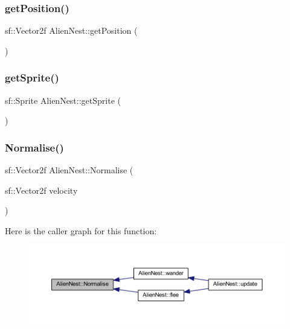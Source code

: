 \mbox{\label{class_alien_nest_a1d0491e4d757b1f068fcdfdff3af4263}} 
\subsubsection{\texorpdfstring{get\+Position()}{getPosition()}}
{\footnotesize\ttfamily sf\+::\+Vector2f Alien\+Nest\+::get\+Position (\begin{DoxyParamCaption}{ }\end{DoxyParamCaption})}

\mbox{\label{class_alien_nest_ab37d12dc080c9433d0b34324160c4540}} 
\subsubsection{\texorpdfstring{get\+Sprite()}{getSprite()}}
{\footnotesize\ttfamily sf\+::\+Sprite Alien\+Nest\+::get\+Sprite (\begin{DoxyParamCaption}{ }\end{DoxyParamCaption})}

\mbox{\label{class_alien_nest_a1482a4dc78827c14dd442a8d9a0a36e3}} 
\subsubsection{\texorpdfstring{Normalise()}{Normalise()}}
{\footnotesize\ttfamily sf\+::\+Vector2f Alien\+Nest\+::\+Normalise (\begin{DoxyParamCaption}\item[{sf\+::\+Vector2f}]{velocity }\end{DoxyParamCaption})}

Here is the caller graph for this function\+:
\nopagebreak
\begin{figure}[H]
\begin{center}
\leavevmode
\includegraphics[width=350pt]{class_alien_nest_a1482a4dc78827c14dd442a8d9a0a36e3_icgraph}
\end{center}
\end{figure}
\mbox{\label{class_alien_nest_a0b47d6d12801e07c6d59592d37444c81}} 
